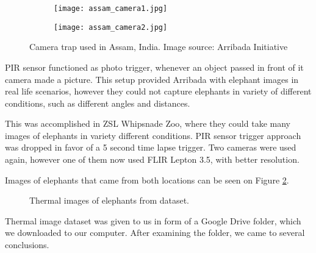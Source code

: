 \begin{figure}[ht]
    \begin{subfigure}{0.5\textwidth}
        \centering
        \texttt{[image: assam\_camera1.jpg]} 
    \end{subfigure}
    \begin{subfigure}{0.5\textwidth}
        \centering
        \texttt{[image: assam\_camera2.jpg]}
    \end{subfigure}
    \caption{Camera trap used in Assam, India. Image source: Arribada Initiative \cite{arribada-assam}}
    \label{assam_camera}
\end{figure}

PIR sensor functioned as photo trigger, whenever an object passed in front of it camera made a picture.
This setup provided Arribada with elephant images in real life scenarios, however they could not capture elephants in variety of different conditions, such as different angles and distances.

This was accomplished in ZSL Whipsnade Zoo, where they could take many images of elephants in variety different conditions\cite{dataset_collection}.
PIR sensor trigger approach was dropped in favor of a 5 second time lapse trigger.
Two cameras were used again, however one of them now used FLIR Lepton 3.5, with better resolution.

Images of elephants that came from both locations can be seen on Figure \ref{four_elephants}.

\begin{figure}[ht]
    \centering
    \caption{Thermal images of elephants from dataset.}
    \label{four_elephants}
\end{figure}

Thermal image dataset was given to us in form of a Google Drive folder, which we downloaded to our computer.
After examining the folder, we came to several conclusions.

